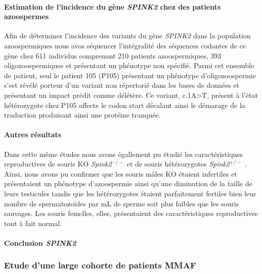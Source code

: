 \documentclass[12pt,twoside]{reedthesis}
\theoremstyle{definition}
\theoremstyle{definition}
\theoremstyle{remark}
\begin{document}
  \paragraph{\texorpdfstring{Estimation de l'incidence du gène
  \emph{SPINK2} chez des patients
  azoospermes}{Estimation de l'incidence du gène SPINK2 chez des patients azoospermes}}\label{estimation-de-lincidence-du-gene-spink2-chez-des-patients-azoospermes}
  
  Afin de déterminer l'incidence des variants du gène \emph{SPINK2} dans
  la population azoospermiques nous avos séquencer l'intégralité des
  séquences codantes de ce gène chez 611 individus comprenant 210 patients
  azoospermiques, 393 oligozoospermiques et présentant un phénotype non
  spécifié. Parmi cet ensemble de patient, seul le patient 105 (P105)
  présentant un phénotype d'oligozoospermie s'est révélé porteur d'un
  variant non répertorié dans les bases de données et présentant un impact
  prédit comme délétère. Ce variant, c.1A\textgreater{}T, présent à l'état
  hétérozygote chez P105 affecte le codon start décalant ainsi le démarage
  de la traduction produisant ainsi une protéine tranquée.
  
  \paragraph{Autres résultats}\label{autres-resultats}
  
  Dans cette même études nous avons égallement pu étudié les
  caractéristiques reproductives de souris KO \emph{Spink2}\(^{-/-}\) et
  de souris hétérozygotes \emph{Spink2}\(^{+/-}\) . Ainsi, nous avons pu
  confirmer que les souris mâles KO étaient infertiles et présentaient un
  phénotype d'azoospermie ainsi qu'une diminution de la taille de leurs
  testicules tandis que les hétérozygotes étaient parfaitement fertiles
  bien leur nombre de spermatozoïdes par mL de sperme soit plus faibles
  que les souris sauvages. Les souris femelles, elles, présentaient des
  caractéristiques reproductives tout à fait normal.
  
  \paragraph{\texorpdfstring{Conclusion
  \emph{SPINK2}}{Conclusion SPINK2}}\label{conclusion-spink2}
  
  \newpage  
  
  \subsubsection{Etude d'une large cohorte de patients
  MMAF}\label{etude-dune-large-cohorte-de-patients-mmaf}
  
\end{document}

